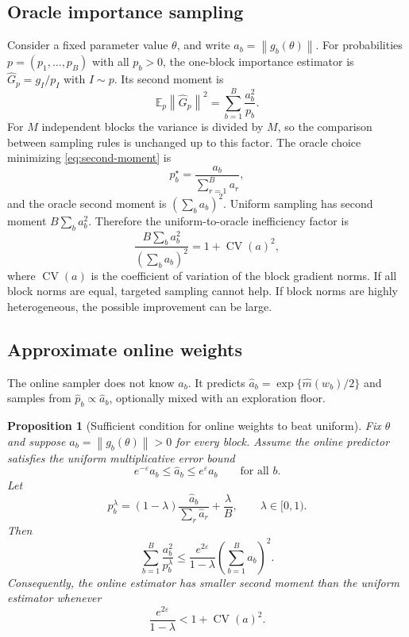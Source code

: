 \documentclass{article}
\newtheorem{proposition}{Proposition}
\newcommand{\E}{\mathbb{E}}
\newcommand{\1}{\mathbf{1}}
\newcommand{\norm}[1]{\left\lVert #1 \right\rVert}
\begin{document}
\subsection{Oracle importance sampling}

Consider a fixed parameter value $\theta$, and write $a_b=\norm{g_b(\theta)}$. For probabilities $p=(p_1,\dots,p_B)$ with all $p_b>0$, the one-block importance estimator is $\widehat G_p=g_I/p_I$ with $I\sim p$. Its second moment is
\begin{equation}
  \E_p \norm{\widehat G_p}^2
  =
  \sum_{b=1}^B \frac{a_b^2}{p_b}.
  \label{eq:second-moment}
\end{equation}
For $M$ independent blocks the variance is divided by $M$, so the comparison between sampling rules is unchanged up to this factor. The oracle choice minimizing \eqref{eq:second-moment} is
\[
  p_b^\star = \frac{a_b}{\sum_{r=1}^B a_r},
\]
and the oracle second moment is $\left(\sum_b a_b\right)^2$. Uniform sampling has second moment $B\sum_b a_b^2$. Therefore the uniform-to-oracle inefficiency factor is
\begin{equation}
  \frac{B\sum_b a_b^2}{(\sum_b a_b)^2}
  =
  1+\operatorname{CV}(a)^2,
  \label{eq:cv-factor}
\end{equation}
where $\operatorname{CV}(a)$ is the coefficient of variation of the block gradient norms. If all block norms are equal, targeted sampling cannot help. If block norms are highly heterogeneous, the possible improvement can be large.

\subsection{Approximate online weights}

The online sampler does not know $a_b$. It predicts $\widehat a_b=\exp\{\widehat m(w_b)/2\}$ and samples from $\widehat p_b \propto \widehat a_b$, optionally mixed with an exploration floor.

\begin{proposition}[Sufficient condition for online weights to beat uniform]
\label{prop:online-useful}
Fix $\theta$ and suppose $a_b=\norm{g_b(\theta)}>0$ for every block. Assume the online predictor satisfies the uniform multiplicative error bound
\[
  e^{-\varepsilon}a_b \le \widehat a_b \le e^\varepsilon a_b
  \qquad \text{for all } b.
\]
Let
\[
  p_b^{\lambda}=(1-\lambda)\frac{\widehat a_b}{\sum_r \widehat a_r}+\frac{\lambda}{B},
  \qquad \lambda\in[0,1).
\]
Then
\[
  \sum_{b=1}^B \frac{a_b^2}{p_b^\lambda}
  \le
  \frac{e^{2\varepsilon}}{1-\lambda}
  \left(\sum_{b=1}^B a_b\right)^2.
\]
Consequently, the online estimator has smaller second moment than the uniform estimator whenever
\begin{equation}
  \frac{e^{2\varepsilon}}{1-\lambda}
  <
  1+\operatorname{CV}(a)^2.
  \label{eq:online-condition}
\end{equation}
\end{proposition}
\end{document}
